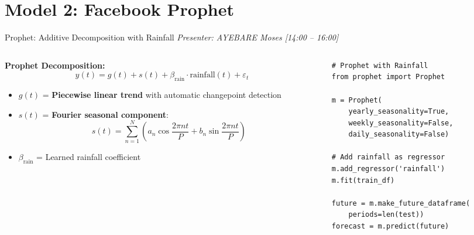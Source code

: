 \documentclass[aspectratio=169,11pt]{beamer}
\begin{document}
\section{Model 2: Facebook Prophet}

\begin{frame}[fragile]{Prophet: Additive Decomposition with Rainfall}
\textit{\small Presenter: AYEBARE Moses \hfill [14:00 -- 16:00]}
\begin{columns}
\begin{column}{0.55\textwidth}
\textbf{Prophet Decomposition:}
$$y(t) = g(t) + s(t) + \beta_{\text{rain}} \cdot \text{rainfall}(t) + \varepsilon_t$$

\begin{itemize}
    \item $g(t)$ = \textbf{Piecewise linear trend} with automatic changepoint detection
    \item $s(t)$ = \textbf{Fourier seasonal component}:
    $$s(t) = \sum_{n=1}^{N}\!\left(a_n\cos\frac{2\pi nt}{P} + b_n\sin\frac{2\pi nt}{P}\right)$$
    \item $\beta_{\text{rain}}$ = Learned rainfall coefficient
\end{itemize}
\end{column}
\begin{column}{0.42\textwidth}
\begin{lstlisting}
# Prophet with Rainfall
from prophet import Prophet

m = Prophet(
    yearly_seasonality=True,
    weekly_seasonality=False,
    daily_seasonality=False)

# Add rainfall as regressor
m.add_regressor('rainfall')
m.fit(train_df)

future = m.make_future_dataframe(
    periods=len(test))
forecast = m.predict(future)
\end{lstlisting}
\end{column}
\end{columns}
\end{frame}
\end{document}
